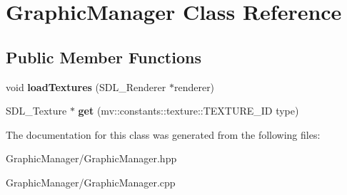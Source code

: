 \hypertarget{class_graphic_manager}{}\section{Graphic\+Manager Class Reference}
\label{class_graphic_manager}
\subsection*{Public Member Functions}
\begin{DoxyCompactItemize}
\item 
\mbox{\label{class_graphic_manager_a73f8b16f083061e06ef9d0022b701e26}} 
void {\bfseries load\+Textures} (S\+D\+L\+\_\+\+Renderer $\ast$renderer)
\item 
\mbox{\label{class_graphic_manager_aa9c1139ace8b5648cdb8ecd0d38f20b1}} 
S\+D\+L\+\_\+\+Texture $\ast$ {\bfseries get} (mv\+::constants\+::texture\+::\+T\+E\+X\+T\+U\+R\+E\+\_\+\+ID type)
\end{DoxyCompactItemize}


The documentation for this class was generated from the following files\+:\begin{DoxyCompactItemize}
\item 
Graphic\+Manager/Graphic\+Manager.\+hpp\item 
Graphic\+Manager/Graphic\+Manager.\+cpp\end{DoxyCompactItemize}
